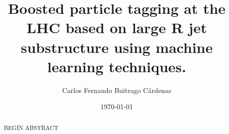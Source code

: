 \documentclass[11pt]{report} %
\providecommand{\main}{.}  %
\def\biblio{}
\begin{document}
\def\biblio{}
\title{Boosted particle tagging at the LHC based on large R jet substructure using machine learning techniques.}
\author{Carlos Fernando Buitrago C\'ardenas}
\date{\today}
\maketitle
\thispagestyle{empty}

\begin{abstract}
\noindent BEGIN ABSTRACT
\end{abstract}

\setlength\cftaftertoctitleskip{10pt}
\renewcommand{\contentsname}{\LARGE\sc Table of Contents}

\strut\vspace{-50pt}
\tableofcontents
\thispagestyle{empty}

\pagebreak


\doublespacing





  













\newpage
\begin{small} %
\singlespacing %
\thispagestyle{empty} %
\end{small} %
\end{document}
